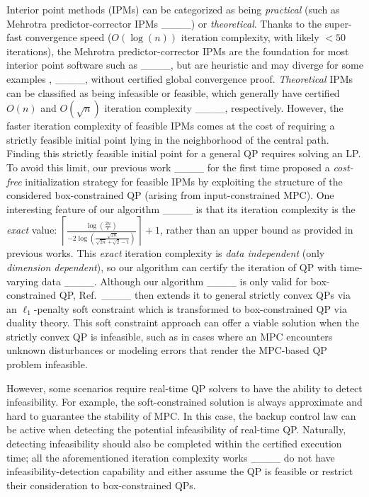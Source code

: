 Interior point methods (IPMs) can be categorized as being \textit{practical} (such as Mehrotra predictor-corrector IPMs ____) or \textit{theoretical}. Thanks to the super-fast convergence speed ($O(\log(n))$ iteration complexity, with likely $<50$ iterations), the Mehrotra predictor-corrector IPMs are the foundation for most interior point software such as ____, but are heuristic and may diverge for some examples \cite[see p.\ 411]{nocedal2006numerical}, ____, without certified global convergence proof. \textit{Theoretical} IPMs can be classified as being infeasible or feasible, which generally have certified $O(n)$ and $O(\sqrt{n})$ iteration complexity ____, respectively. However, the faster iteration complexity of feasible IPMs comes at the cost of requiring a strictly feasible initial point lying in the neighborhood of the central path. Finding this strictly feasible initial point for a general QP requires solving an LP. To avoid this limit, our previous work ____ for the first time proposed a \textit{cost-free} initialization strategy for feasible IPMs by exploiting the structure of the considered box-constrained QP (arising from input-constrained MPC). One interesting feature of our algorithm ____ is that its iteration complexity is the \textit{exact} value: $
\!\left\lceil\frac{\log(\frac{2n}{\epsilon})}{-2\log(\frac{\sqrt{2n}}{\sqrt{2n}+\sqrt{2}-1})}\right\rceil \! + 1
$, rather than an upper bound as provided in previous works. This \textit{exact} iteration complexity is \textit{data independent} (only \textit{dimension dependent}), so our algorithm can certify the iteration of QP with time-varying data ____. Although our algorithm ____ is only valid for box-constrained QP, Ref.\ ____ then extends it to general strictly convex QPs via an $\ell_1$-penalty soft constraint which is transformed to box-constrained QP via duality theory. This soft constraint approach can offer a viable solution when the strictly convex QP is infeasible, such as in cases where an MPC encounters unknown disturbances or modeling errors that render the MPC-based QP problem infeasible.

However, some scenarios require real-time QP solvers to have the ability to detect infeasibility. For example, the soft-constrained solution is always approximate and hard to guarantee the stability of MPC. In this case, the backup control law can be active when detecting the potential infeasibility of real-time QP. Naturally, detecting infeasibility should also be completed within the certified execution time; all the aforementioned iteration complexity works ____ do not have infeasibility-detection capability and either assume the QP is feasible or restrict their consideration to box-constrained QPs. 

